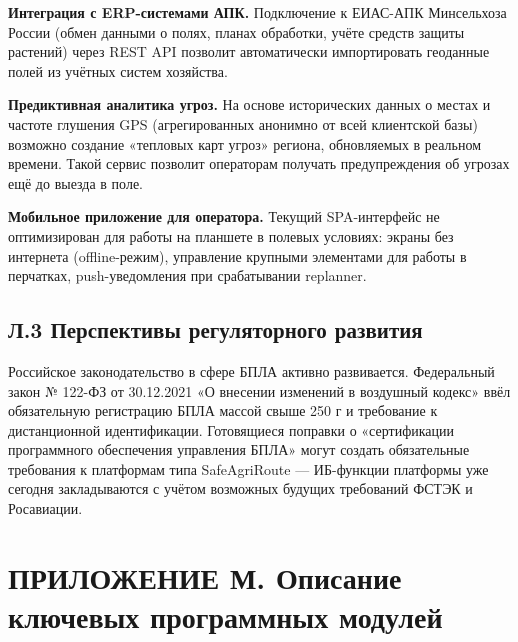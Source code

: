 \documentclass[14pt,a4paper]{extarticle}
\begin{document}
\textbf{Интеграция с ERP-системами АПК.} Подключение к ЕИАС-АПК Минсельхоза России (обмен данными о полях, планах обработки, учёте средств защиты растений) через REST API позволит автоматически импортировать геоданные полей из учётных систем хозяйства.

\textbf{Предиктивная аналитика угроз.} На основе исторических данных о местах и частоте глушения GPS (агрегированных анонимно от всей клиентской базы) возможно создание «тепловых карт угроз» региона, обновляемых в реальном времени. Такой сервис позволит операторам получать предупреждения об угрозах ещё до выезда в поле.

\textbf{Мобильное приложение для оператора.} Текущий SPA-интерфейс не оптимизирован для работы на планшете в полевых условиях: экраны без интернета (offline-режим), управление крупными элементами для работы в перчатках, push-уведомления при срабатывании replanner.

\hypertarget{ux43b.3-ux43fux435ux440ux441ux43fux435ux43aux442ux438ux432ux44b-ux440ux435ux433ux443ux43bux44fux442ux43eux440ux43dux43eux433ux43e-ux440ux430ux437ux432ux438ux442ux438ux44f}{%
\subsection{Л.3 Перспективы регуляторного развития}\label{ux43b.3-ux43fux435ux440ux441ux43fux435ux43aux442ux438ux432ux44b-ux440ux435ux433ux443ux43bux44fux442ux43eux440ux43dux43eux433ux43e-ux440ux430ux437ux432ux438ux442ux438ux44f}}

Российское законодательство в сфере БПЛА активно развивается. Федеральный закон № 122-ФЗ от 30.12.2021 «О внесении изменений в воздушный кодекс» ввёл обязательную регистрацию БПЛА массой свыше 250 г и требование к дистанционной идентификации. Готовящиеся поправки о «сертификации программного обеспечения управления БПЛА» могут создать обязательные требования к платформам типа SafeAgriRoute --- ИБ-функции платформы уже сегодня закладываются с учётом возможных будущих требований ФСТЭК и Росавиации.


\hypertarget{ux43fux440ux438ux43bux43eux436ux435ux43dux438ux435-ux43c.-ux43eux43fux438ux441ux430ux43dux438ux435-ux43aux43bux44eux447ux435ux432ux44bux445-ux43fux440ux43eux433ux440ux430ux43cux43cux43dux44bux445-ux43cux43eux434ux443ux43bux435ux439}{%
\section{ПРИЛОЖЕНИЕ М. Описание ключевых программных модулей}\label{ux43fux440ux438ux43bux43eux436ux435ux43dux438ux435-ux43c.-ux43eux43fux438ux441ux430ux43dux438ux435-ux43aux43bux44eux447ux435ux432ux44bux445-ux43fux440ux43eux433ux440ux430ux43cux43cux43dux44bux445-ux43cux43eux434ux443ux43bux435ux439}}
\end{document}
